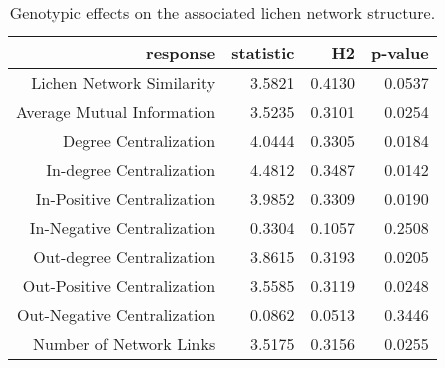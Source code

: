\begin{table}[ht]
\centering
\begin{tabular}{rrrr}
  \hline
response & statistic & H2 & p-value \\ 
  \hline
Lichen Network Similarity & 3.5821 & 0.4130 & 0.0537 \\ 
  Average Mutual Information & 3.5235 & 0.3101 & 0.0254 \\ 
  Degree Centralization & 4.0444 & 0.3305 & 0.0184 \\ 
  In-degree Centralization & 4.4812 & 0.3487 & 0.0142 \\ 
  In-Positive Centralization & 3.9852 & 0.3309 & 0.0190 \\ 
  In-Negative Centralization & 0.3304 & 0.1057 & 0.2508 \\ 
  Out-degree Centralization & 3.8615 & 0.3193 & 0.0205 \\ 
  Out-Positive Centralization & 3.5585 & 0.3119 & 0.0248 \\ 
  Out-Negative Centralization & 0.0862 & 0.0513 & 0.3446 \\ 
  Number of Network Links & 3.5175 & 0.3156 & 0.0255 \\ 
   \hline
\end{tabular}
\caption{Genotypic effects on the associated lichen network structure.} 
\label{tab:h2_net}
\end{table}
